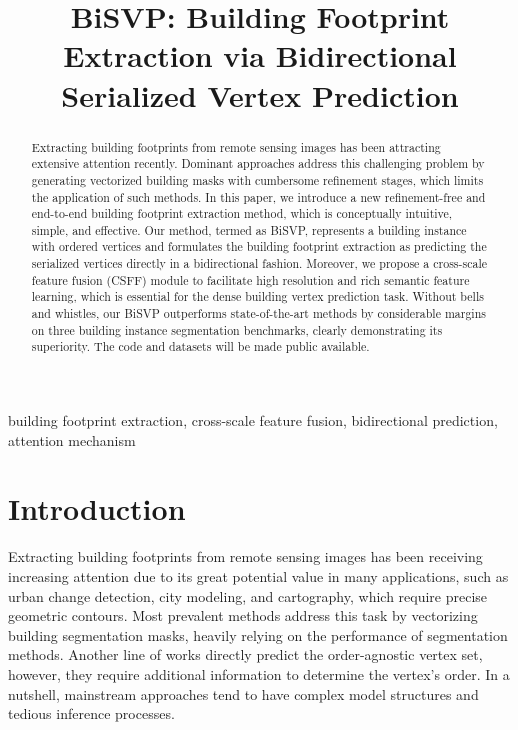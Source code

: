 \documentclass{article}
\title{BiSVP: Building Footprint Extraction via Bidirectional Serialized Vertex Prediction}
\begin{document}
%
\maketitle
%
\begin{abstract}
\small
Extracting building footprints from remote sensing images has been attracting extensive attention recently. Dominant approaches address this challenging problem by generating vectorized building masks with cumbersome refinement stages, which limits the application of such methods. In this paper, we introduce a new refinement-free and end-to-end building footprint extraction method, which is conceptually intuitive, simple, and effective. Our method, termed as BiSVP, represents a building instance with ordered vertices and formulates the building footprint extraction as predicting the serialized vertices directly in a bidirectional fashion. Moreover, we propose a cross-scale feature fusion (CSFF) module to facilitate high resolution and rich semantic feature learning, which is essential for the dense building vertex prediction task. Without bells and whistles, our BiSVP outperforms state-of-the-art methods by considerable margins on three building instance segmentation benchmarks, clearly demonstrating its superiority. The code and datasets will be made public available.
\end{abstract}
%
\begin{keywords}
building footprint extraction, cross-scale feature fusion, bidirectional prediction, attention mechanism
\end{keywords}
%
\section{Introduction}
\label{sec:intro}

Extracting building footprints from remote sensing images has been receiving increasing attention due to its great potential value in many applications, such as urban change detection, city modeling, and cartography, which require precise geometric contours. Most prevalent methods address this task by vectorizing building segmentation masks, heavily relying on the performance of segmentation methods. Another line of works directly predict the order-agnostic vertex set, however, they require additional information to determine the vertex's order. In a nutshell, mainstream approaches tend to have complex model structures and tedious inference processes.
\end{document}
